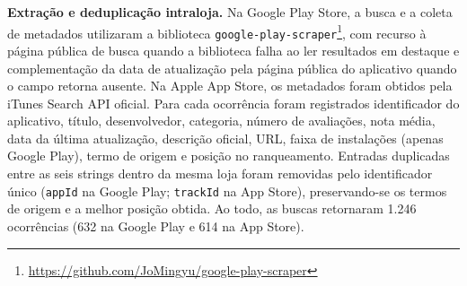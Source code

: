\textbf{Extração e deduplicação intraloja.} Na Google Play Store, a busca e a coleta de metadados utilizaram a biblioteca \texttt{google-play-scraper}\footnote{\url{https://github.com/JoMingyu/google-play-scraper}}, com recurso à página pública de busca quando a biblioteca falha ao ler resultados em destaque e complementação da data de atualização pela página pública do aplicativo quando o campo retorna ausente. Na Apple App Store, os metadados foram obtidos pela iTunes Search API oficial. Para cada ocorrência foram registrados identificador do aplicativo, título, desenvolvedor, categoria, número de avaliações, nota média, data da última atualização, descrição oficial, URL, faixa de instalações (apenas Google Play), termo de origem e posição no ranqueamento. Entradas duplicadas entre as seis strings dentro da mesma loja foram removidas pelo identificador único (\texttt{appId} na Google Play; \texttt{trackId} na App Store), preservando-se os termos de origem e a melhor posição obtida. Ao todo, as buscas retornaram 1.246 ocorrências (632 na Google Play e 614 na App Store).

